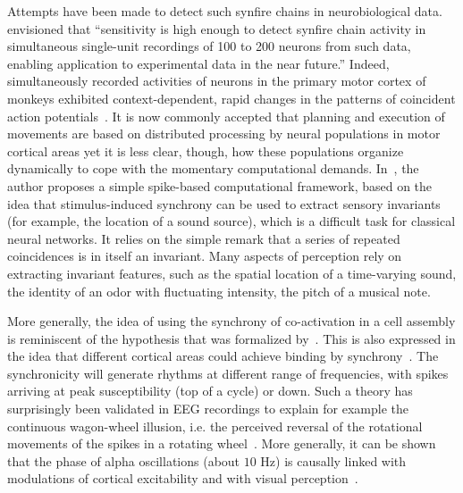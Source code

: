 \documentclass[brainsci, %
               review,submit,pdftex,moreauthors
               ]{Definitions/mdpi}
\begin{document}

Attempts have been made to detect such synfire chains in neurobiological data.~\citet{schrader_detecting_2008} envisioned that ``sensitivity is high enough to detect synfire chain activity in simultaneous single-unit recordings of 100 to 200 neurons from such data, enabling application to experimental data in the near future.'' Indeed, simultaneously recorded activities of neurons in the primary motor cortex of monkeys exhibited context-dependent, rapid changes in the patterns of coincident action potentials~\citep{riehle_spike_1997,grammont_precise_1999}. It is now commonly accepted that planning and execution of movements are based on distributed processing by neural populations in motor cortical areas yet it is less clear, though, how these populations organize dynamically to cope with the momentary computational demands.  In~\citep{brette_computing_2012}, the author proposes a simple spike-based computational framework, based on the idea that stimulus-induced synchrony can be used to extract sensory invariants (for example, the location of a sound source), which is a difficult task for classical neural networks. It relies on the simple remark that a series of repeated coincidences is in itself an invariant. Many aspects of perception rely on extracting invariant features, such as the spatial location of a time-varying sound, the identity of an odor with fluctuating intensity, the pitch of a musical note.

More generally, the idea of using the synchrony of co-activation in a cell assembly is reminiscent of the hypothesis that was formalized by~\citet{hebb_organization_1949}. 
This is also expressed in the idea that different cortical areas could achieve binding by synchrony~\citep{fries_mechanism_2005}. The synchronicity will generate rhythms at different range of frequencies, with spikes arriving at peak susceptibility (top of a cycle) or down. Such a theory has surprisingly been validated in EEG recordings to explain for example the continuous wagon-wheel illusion, i.e. the perceived reversal of the rotational movements of the spikes in a rotating wheel~\citep{vanrullen_continuous_2006}. More generally, it can be shown that the phase of alpha oscillations (about $10$ Hz) is causally linked with modulations of cortical excitability and with visual perception~\citep{dugue_phase_2011}. 
%
\end{document}
